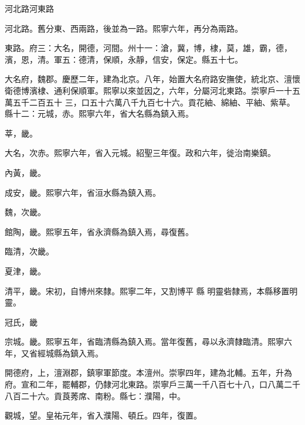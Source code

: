 
\begin{pinyinscope}

 河北路河東路



 河北路。舊分東、西兩路，後並為一路。熙寧六年，再分為兩路。



 東路。府三：大名，開德，河間。州十一：滄，冀，博，棣，莫，雄，霸，德，濱，恩，清。軍五：德清，保順，永靜，信安，保定。縣五十七。



 大名府，魏郡。慶歷二年，建為北京。八年，始置大名府路安撫使，統北京、澶懷衛德博濱棣、通利保順軍。熙寧以來並因之，六年，分屬河北東路。崇寧戶一十五萬五千二百五十
 三，口五十六萬八千九百七十六。貢花紬、綿紬、平紬、紫草。縣十二：元城，赤。熙寧六年，省大名縣為鎮入焉。



 莘，畿。



 大名，次赤。熙寧六年，省入元城。紹聖三年復。政和六年，徙治南樂鎮。



 內黃，畿。



 成安，畿。熙寧六年，省洹水縣為鎮入焉。



 魏，次畿。



 館陶，畿。熙寧五年，省永濟縣為鎮入焉，尋復舊。



 臨清，次畿。



 夏津，畿。



 清平，畿。宋初，自博州來隸。熙寧二年，又割博平
 縣
 明靈砦隸焉，本縣移置明靈。



 冠氏，畿



 宗城。畿。熙寧五年，省臨清縣為鎮入焉。當年復舊，尋以永濟隸臨清。熙寧六年，又省經城縣為鎮入焉。



 開德府，上，澶淵郡，鎮寧軍節度。本澶州。崇寧四年，建為北輔。五年，升為府。宣和二年，罷輔郡，仍隸河北東路。崇寧戶三萬一千八百七十八，口八萬二千八百二十六。貢莨莠席、南粉。縣七：濮陽，中。



 觀城，望。皇祐元年，省入濮陽、頓丘。四年，復置。




\end{pinyinscope}
